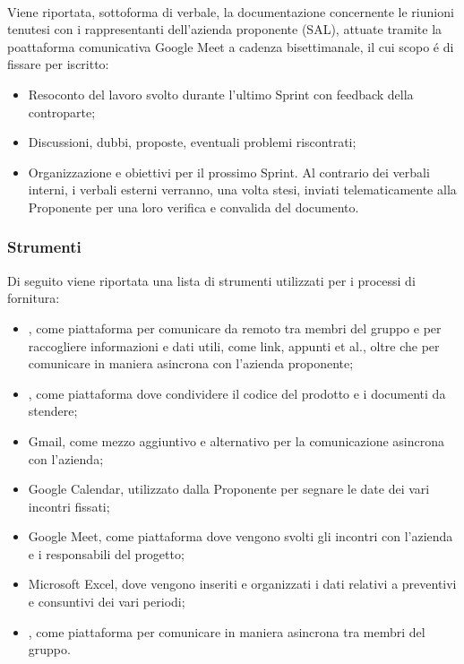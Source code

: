 \\
Viene riportata, sottoforma di verbale, la documentazione concernente le riunioni tenutesi con i rappresentanti dell'azienda proponente (SAL), attuate tramite la poattaforma comunicativa Google Meet a cadenza bisettimanale, il cui scopo é di fissare per iscritto:
\begin{itemize}
    \item Resoconto del lavoro svolto durante l'ultimo Sprint con feedback della controparte;
    \item Discussioni, dubbi, proposte, eventuali problemi riscontrati;
    \item Organizzazione e obiettivi per il prossimo Sprint.
Al contrario dei verbali interni, i verbali esterni verranno, una volta stesi, inviati telematicamente alla Proponente per una loro verifica e convalida del documento.
\end{itemize} 

\subsubsection{Strumenti}
Di seguito viene riportata una lista di strumenti utilizzati per i processi di fornitura:
\begin{itemize}
    \item {}, come piattaforma per comunicare da remoto tra membri del gruppo e per raccogliere informazioni e dati utili, come link, appunti et al., oltre che per comunicare in maniera asincrona con l'azienda proponente;
    \item {}, come piattaforma dove condividere il codice del prodotto e i documenti da stendere;
    \item Gmail, come mezzo aggiuntivo e alternativo per la comunicazione asincrona con l'azienda;
    \item Google Calendar, utilizzato dalla Proponente per segnare le date dei vari incontri fissati;
    \item Google Meet, come piattaforma dove vengono svolti gli incontri con l'azienda e i responsabili del progetto; 
    \item Microsoft Excel, dove vengono inseriti e organizzati i dati relativi a preventivi e consuntivi dei vari periodi; 
    \item {}, come piattaforma per comunicare in maniera asincrona tra membri del gruppo. 
\end{itemize}
